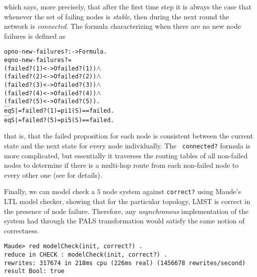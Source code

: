 \documentclass[copyright,creativecommons]{eptcs}
\begin{document}
\noindent
which says, more precisely, that after the first time step it is always the
case that whenever the set of failing nodes is \emph{stable}, then during the
next round the network is \emph{connected}. The formula characterizing when
there are no new node failures is defined as

\begin{center}
\begin{small}
\begin{boxedminipage}{0.50\textwidth}
\begin{alltt}
op no-new-failures? : -> Formula .
eq no-new-failures? = 
    (failed?(1) <-> O failed?(1)) \(\wedge\)
    (failed?(2) <-> O failed?(2)) \(\wedge\)
    (failed?(3) <-> O failed?(3)) \(\wedge\)
    (failed?(4) <-> O failed?(4)) \(\wedge\)
    (failed?(5) <-> O failed?(5)) .
\(\dotso\)
eq S |= failed?(1) = pi1(S) == failed .
\(\dotso\)
eq S |= failed?(5) = pi5(S) == failed .
\end{alltt}
\end{boxedminipage}
\end{small}
\end{center}

\noindent
that is, that the failed proposition for each node is consistent between the
current state and the next state for every node individually. The {\tt
connected?} formula is more complicated, but essentially it traverses the
routing tables of all non-failed nodes to determine if there is a multi-hop
route from each non-failed node to every other one (see \cite{katelman_2010_01}
for details).

Finally, we can model check a $5$ node system against {\tt correct?} using
Maude's LTL model checker, showing that for the particular topology, LMST is
correct in the presence of node failure. Therefore, any \emph{asynchronous}
implementation of the system had through the PALS transformation would satisfy
the same notion of correctness.

\begin{center}
\begin{small}
\begin{boxedminipage}{0.85\textwidth}
\begin{verbatim}
Maude> red modelCheck(init, correct?) .
reduce in CHECK : modelCheck(init, correct?) .
rewrites: 317674 in 218ms cpu (226ms real) (1456678 rewrites/second)
result Bool: true
\end{verbatim}
\end{boxedminipage}
\end{small}
\end{center}
\end{document}
